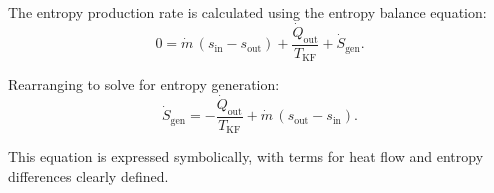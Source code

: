 The entropy production rate is calculated using the entropy balance equation:  
\[
0 = \dot{m} \, (s_{\text{in}} - s_{\text{out}}) + \frac{\dot{Q}_{\text{out}}}{T_{\text{KF}}} + \dot{S}_{\text{gen}}.
\]  

Rearranging to solve for entropy generation:  
\[
\dot{S}_{\text{gen}} = -\frac{\dot{Q}_{\text{out}}}{T_{\text{KF}}} + \dot{m} \, (s_{\text{out}} - s_{\text{in}}).
\]  

This equation is expressed symbolically, with terms for heat flow and entropy differences clearly defined.